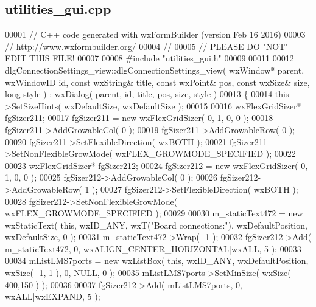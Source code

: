 \subsection{utilities\+\_\+gui.\+cpp}
\label{utilities__gui_8cpp_source}

\begin{DoxyCode}
00001 \textcolor{comment}{// C++ code generated with wxFormBuilder (version Feb 16 2016)}
00003 \textcolor{comment}{// http://www.wxformbuilder.org/}
00004 \textcolor{comment}{//}
00005 \textcolor{comment}{// PLEASE DO "NOT" EDIT THIS FILE!}
00007 \textcolor{comment}{}
00008 \textcolor{preprocessor}{#include "utilities_gui.h"}
00009 
00011 
00012 dlgConnectionSettings_view::dlgConnectionSettings_view( wxWindow* parent, wxWindowID \textcolor{keywordtype}{id}, \textcolor{keyword}{const} wxString& 
      title, \textcolor{keyword}{const} wxPoint& pos, \textcolor{keyword}{const} wxSize& size, \textcolor{keywordtype}{long} style ) : wxDialog( parent, id, title, pos, size, style )
00013 \{
00014     this->SetSizeHints( wxDefaultSize, wxDefaultSize );
00015     
00016     wxFlexGridSizer* fgSizer211;
00017     fgSizer211 = \textcolor{keyword}{new} wxFlexGridSizer( 0, 1, 0, 0 );
00018     fgSizer211->AddGrowableCol( 0 );
00019     fgSizer211->AddGrowableRow( 0 );
00020     fgSizer211->SetFlexibleDirection( wxBOTH );
00021     fgSizer211->SetNonFlexibleGrowMode( wxFLEX\_GROWMODE\_SPECIFIED );
00022     
00023     wxFlexGridSizer* fgSizer212;
00024     fgSizer212 = \textcolor{keyword}{new} wxFlexGridSizer( 0, 1, 0, 0 );
00025     fgSizer212->AddGrowableCol( 0 );
00026     fgSizer212->AddGrowableRow( 1 );
00027     fgSizer212->SetFlexibleDirection( wxBOTH );
00028     fgSizer212->SetNonFlexibleGrowMode( wxFLEX\_GROWMODE\_SPECIFIED );
00029     
00030     m_staticText472 = \textcolor{keyword}{new} wxStaticText( \textcolor{keyword}{this}, wxID\_ANY, wxT(\textcolor{stringliteral}{"Board connections:"}), wxDefaultPosition, 
      wxDefaultSize, 0 );
00031     m_staticText472->Wrap( -1 );
00032     fgSizer212->Add( m_staticText472, 0, wxALIGN\_CENTER\_HORIZONTAL|wxALL, 5 );
00033     
00034     mListLMS7ports = \textcolor{keyword}{new} wxListBox( \textcolor{keyword}{this}, wxID\_ANY, wxDefaultPosition, wxSize( -1,-1 ), 0, NULL, 0 ); 
00035     mListLMS7ports->SetMinSize( wxSize( 400,150 ) );
00036     
00037     fgSizer212->Add( mListLMS7ports, 0, wxALL|wxEXPAND, 5 );

\end{DoxyCode}
